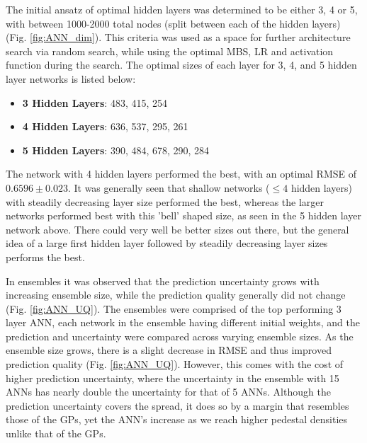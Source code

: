 \documentclass[a4paper, twoside, final, 12pt]{article}
\begin{document}
{The initial ansatz of optimal hidden layers was determined to be either 3, 4 or 5, with between 1000-2000 total nodes (split between each of the hidden layers) (Fig. \ref{fig:ANN_dim}). This criteria was used as a space for further architecture search via random search, while using the optimal MBS, LR and activation function during the search. 
The optimal sizes of each layer for 3, 4, and 5 hidden layer networks is listed below: 
\begin{itemize}
	\item \textbf{3 Hidden Layers}: 483, 415, 254
	\item \textbf{4 Hidden Layers}: 636, 537, 295, 261
	\item \textbf{5 Hidden Layers}: 390, 484, 678, 290, 284
\end{itemize} 
The network with 4 hidden layers performed the best, with an optimal RMSE of $0.6596 \pm 0.023$. 
It was generally seen that shallow networks ($\leq 4$ hidden layers) with steadily decreasing layer size performed the best, whereas the larger networks performed best with this 'bell' shaped size, as seen in the 5 hidden layer network above. 
There could very well be better sizes out there, but the general idea of a large first hidden layer followed by steadily decreasing layer sizes performs the best.

In ensembles it was observed that the prediction uncertainty grows with increasing ensemble size, while the prediction quality generally did not change (Fig. \ref{fig:ANN_UQ}). The ensembles were comprised of the top performing 3 layer ANN, each network in the ensemble having different initial weights, and the prediction and uncertainty were compared across varying ensemble sizes. As the ensemble size grows, there is a slight decrease in RMSE and thus improved prediction quality (Fig. \ref{fig:ANN_UQ}). However, this comes with the cost of higher prediction uncertainty, where the uncertainty in the ensemble with 15 ANNs has nearly double the uncertainty for that of 5 ANNs. Although the prediction uncertainty covers the spread, it does so by a margin that resembles those of the GPs, yet the ANN's increase as we reach higher pedestal densities unlike that of the GPs. 

}
\end{document}
